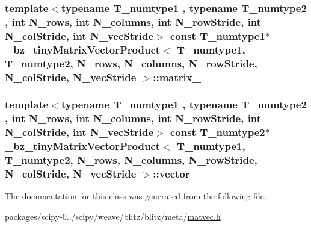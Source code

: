 \subsubsection[{matrix\+\_\+}]{\setlength{\rightskip}{0pt plus 5cm}template$<$typename T\+\_\+numtype1 , typename T\+\_\+numtype2 , int N\+\_\+rows, int N\+\_\+columns, int N\+\_\+row\+Stride, int N\+\_\+col\+Stride, int N\+\_\+vec\+Stride$>$ const T\+\_\+numtype1$\ast$ {\bf \+\_\+bz\+\_\+tiny\+Matrix\+Vector\+Product}$<$ T\+\_\+numtype1, T\+\_\+numtype2, N\+\_\+rows, N\+\_\+columns, N\+\_\+row\+Stride, N\+\_\+col\+Stride, N\+\_\+vec\+Stride $>$\+::matrix\+\_\+\hspace{0.3cm}{\ttfamily [protected]}}\label{class__bz__tinyMatrixVectorProduct_a0da5a156f008517b588fc17334754eef}
\hypertarget{class__bz__tinyMatrixVectorProduct_ab9bddf4fc7e8522519e5c1987d055235}{}
\subsubsection[{vector\+\_\+}]{\setlength{\rightskip}{0pt plus 5cm}template$<$typename T\+\_\+numtype1 , typename T\+\_\+numtype2 , int N\+\_\+rows, int N\+\_\+columns, int N\+\_\+row\+Stride, int N\+\_\+col\+Stride, int N\+\_\+vec\+Stride$>$ const T\+\_\+numtype2$\ast$ {\bf \+\_\+bz\+\_\+tiny\+Matrix\+Vector\+Product}$<$ T\+\_\+numtype1, T\+\_\+numtype2, N\+\_\+rows, N\+\_\+columns, N\+\_\+row\+Stride, N\+\_\+col\+Stride, N\+\_\+vec\+Stride $>$\+::vector\+\_\+\hspace{0.3cm}{\ttfamily [protected]}}\label{class__bz__tinyMatrixVectorProduct_ab9bddf4fc7e8522519e5c1987d055235}


The documentation for this class was generated from the following file\+:\begin{DoxyCompactItemize}
\item 
packages/scipy-\/0../scipy/weave/blitz/blitz/meta/\hyperlink{matvec_8h}{matvec.\+h}\end{DoxyCompactItemize}
